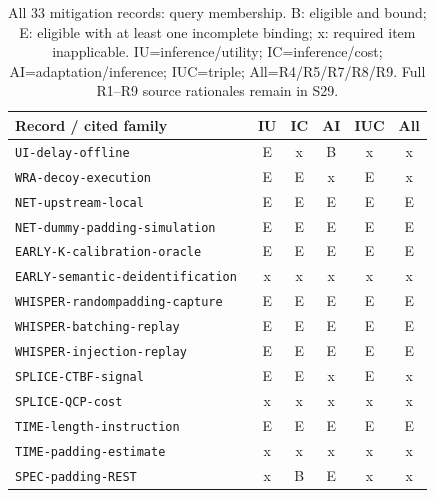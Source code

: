 \begin{table}[t]\centering\scriptsize
\caption{All 33 mitigation records: query membership. B: eligible and bound; E: eligible with at least one incomplete binding; x: required item inapplicable. IU=inference/utility; IC=inference/cost; AI=adaptation/inference; IUC=triple; All=R4/R5/R7/R8/R9. Full R1--R9 source rationales remain in S29.}\label{tab:r33-membership}
\begin{tabularx}{\textwidth}{@{}Yccccc@{}}\toprule
Record / cited family & IU & IC & AI & IUC & All\\\midrule
\texttt{UI-\allowbreak{}delay-\allowbreak{}offline}~\cite{uitraces2026} & E & x & B & x & x\\
\texttt{WRA-\allowbreak{}decoy-\allowbreak{}execution}~\cite{jeong2026wra} & E & E & x & E & x\\
\texttt{NET-\allowbreak{}upstream-\allowbreak{}local}~\cite{netecho2025} & E & E & E & E & E\\
\texttt{NET-\allowbreak{}dummy-\allowbreak{}padding-\allowbreak{}simulation}~\cite{netecho2025} & E & E & E & E & E\\
\texttt{EARLY-\allowbreak{}K-\allowbreak{}calibration-\allowbreak{}oracle}~\cite{earlybird2025} & E & E & E & E & E\\
\texttt{EARLY-\allowbreak{}semantic-\allowbreak{}deidentification}~\cite{earlybird2025} & x & x & x & x & x\\
\texttt{WHISPER-\allowbreak{}randompadding-\allowbreak{}capture}~\cite{whisperleak2025} & E & E & E & E & E\\
\texttt{WHISPER-\allowbreak{}batching-\allowbreak{}replay}~\cite{whisperleak2025} & E & E & E & E & E\\
\texttt{WHISPER-\allowbreak{}injection-\allowbreak{}replay}~\cite{whisperleak2025} & E & E & E & E & E\\
\texttt{SPLICE-\allowbreak{}CTBF-\allowbreak{}signal}~\cite{spliceleak2026} & E & E & x & E & x\\
\texttt{SPLICE-\allowbreak{}QCP-\allowbreak{}cost}~\cite{spliceleak2026} & x & x & x & x & x\\
\texttt{TIME-\allowbreak{}length-\allowbreak{}instruction}~\cite{timewilltell2024} & E & E & E & E & E\\
\texttt{TIME-\allowbreak{}padding-\allowbreak{}estimate}~\cite{timewilltell2024} & x & x & x & x & x\\
\texttt{SPEC-\allowbreak{}padding-\allowbreak{}REST}~\cite{wei2024speculation} & x & B & E & x & x\\

\end{tabularx}
\end{table}
